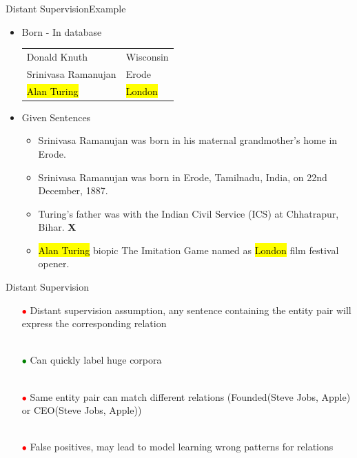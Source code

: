 \documentclass{beamer}
\makeatletter
\newcommand\SoulColor{%
  \let\set@color\beamerorig@set@color
  \let\reset@color\beamerorig@reset@color}
\makeatother
\begin{document}
\begin{frame}{Distant Supervision}{Example}
\begin{itemize}
 
\item Born - In database
 \begin{center}
\begin{tabular}{|l|l|}
\hline
Donald Knuth & Wisconsin \\
Srinivasa Ramanujan & Erode \\
\SoulColor\hl{Alan Turing} & \SoulColor\hl{London} \\
\hline
\end{tabular}
\end{center}
\item Given Sentences
\begin{itemize}
\item Srinivasa Ramanujan was born in his maternal grandmother’s home in Erode.   \checkmark
\item Srinivasa Ramanujan was born in Erode, Tamilnadu, India, on 22nd December, 1887.   \checkmark
\item Turing's father was with the Indian Civil Service (ICS) at Chhatrapur, Bihar. \textbf{X}
\item \alert<+> {\SoulColor\hl{Alan Turing} biopic The Imitation Game named as \SoulColor\hl{London} film festival opener.} 
\end{itemize}
\end{itemize}
 
\end{frame}

\begin{frame}{Distant Supervision} \pause
\begin{itemize}
\item[\textcolor{red}{$\bullet$}] Distant supervision assumption, any sentence containing the entity pair will express the corresponding relation \pause \\~\\
\item[\textcolor{green}{$\bullet$}] Can quickly label huge corpora \pause \\~\\
\item[\textcolor{red}{$\bullet$}] Same entity pair can match different relations (Founded(Steve Jobs, Apple) or CEO(Steve Jobs, Apple)) \pause \\~\\
\item[\textcolor{red}{$\bullet$}] False positives, may lead to model learning wrong patterns for relations 
\end{itemize}
\end{frame}
\end{document}
